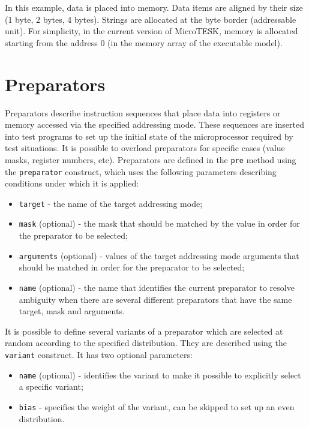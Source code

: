 \documentclass[oneside,final,12pt]{extreport}
\begin{document}
In this example, data is placed into memory. Data items are aligned by their size
(1 byte, 2 bytes, 4 bytes). Strings are allocated at the byte border (addressable
unit). For simplicity, in the current version of MicroTESK, memory is allocated
starting from the address 0 (in the memory array of the executable model).


\section{Preparators}

Preparators describe instruction sequences that place data into registers or memory
accessed via the specified addressing mode. These sequences are inserted into test programs to
set up the initial state of the microprocessor required by test situations. It is possible to
overload preparators for specific cases (value masks, register numbers, etc).
Preparators are defined in the {\tt pre} method using the {\tt preparator} construct, which uses
the following parameters describing conditions under which it is applied:

\begin{itemize}
\item {\tt target} - the name of the target addressing mode;
\item {\tt mask} (optional) - the mask that should be matched by the value in order for the
       preparator to be selected;
\item {\tt arguments} (optional) - values of the target addressing mode arguments that should
      be matched in order for the preparator to be selected;
\item {\tt name} (optional) - the name that identifies the current preparator to resolve ambiguity
      when there are several different preparators that have the same target, mask and arguments.
\end{itemize}

It is possible to define several variants of a preparator which are selected at random according to
the specified distribution. They are described using the {\tt variant} construct. It has two
optional parameters:

\begin{itemize}
\item {\tt name} (optional) - identifies the variant to make it possible to explicitly select
      a specific variant;
\item {\tt bias} - specifies the weight of the variant, can be skipped to set up an even
      distribution.
\end{itemize}
\end{document}
